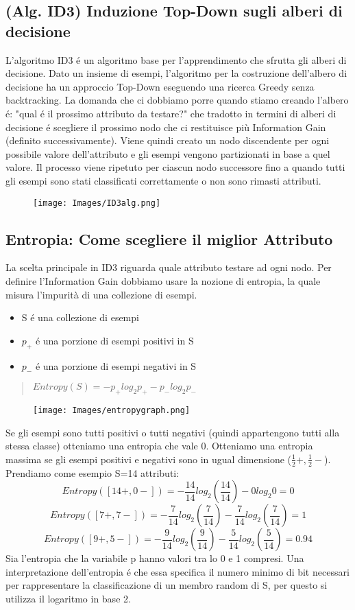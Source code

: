 \documentclass{article}
\begin{document}
\subsection{(Alg. ID3) Induzione Top-Down sugli alberi di decisione}
L'algoritmo ID3 é un algoritmo base per l'apprendimento che sfrutta gli alberi di decisione. Dato un insieme di esempi, l'algoritmo per la costruzione dell'albero di decisione ha un approccio Top-Down eseguendo una ricerca Greedy senza backtracking. La domanda che ci dobbiamo porre quando stiamo creando l'albero é: "qual é il prossimo attributo da testare?" che tradotto in termini di alberi di decisione é scegliere il prossimo nodo che ci restituisce più Information Gain (definito successivamente). Viene quindi creato un nodo discendente per ogni possibile valore dell'attributo e gli esempi vengono partizionati in base a quel valore. Il processo viene ripetuto per ciascun nodo successore fino a quando tutti gli esempi sono stati classificati correttamente o non sono rimasti attributi.
\begin{figure}[H]
\centering
\texttt{[image: Images/ID3alg.png]}
\end{figure}

\subsection{Entropia: Come scegliere il miglior Attributo}
La scelta principale in ID3 riguarda quale attributo testare ad ogni nodo. Per definire l'Information Gain dobbiamo usare la nozione di entropia, la quale misura l'impurità di una collezione di esempi.
\begin{itemize}
    \item S é una collezione di esempi
    \item $p_+$ é una porzione di esempi positivi in S
    \item $p_-$ é una porzione di esempi negativi in S
\end{itemize}
\begin{quote}
    $Entropy(S)=-p_+ log_2 p_+ -p_- log_2 p_-$
\end{quote}
\begin{figure}[H]
\centering
\texttt{[image: Images/entropygraph.png]}
\end{figure}
Se gli esempi sono tutti positivi o tutti negativi (quindi appartengono tutti alla stessa classe) otteniamo una entropia che vale 0. Otteniamo una entropia massima se gli esempi positivi e negativi sono in ugual dimensione ($\frac{1}{2}+,\frac{1}{2}-$). \newline 
Prendiamo come esempio S=14 attributi:
\[Entropy([14+,0-])=-\frac{14}{14}log_2(\frac{14}{14}) - 0 log_2 0 = 0\]
\[Entropy([7+,7-])=-\frac{7}{14}log_2(\frac{7}{14}) - \frac{7}{14}log_2(\frac{7}{14}) = 1\]
\[Entropy([9+,5-])=-\frac{9}{14}log_2(\frac{9}{14}) - \frac{5}{14}log_2(\frac{5}{14}) = 0.94\]
Sia l'entropia che la variabile p hanno valori tra lo 0 e 1 compresi. Una interpretazione dell'entropia é che essa specifica il numero minimo di bit necessari per rappresentare la classificazione di un membro random di S, per questo si utilizza il logaritmo in base 2.
\end{document}
